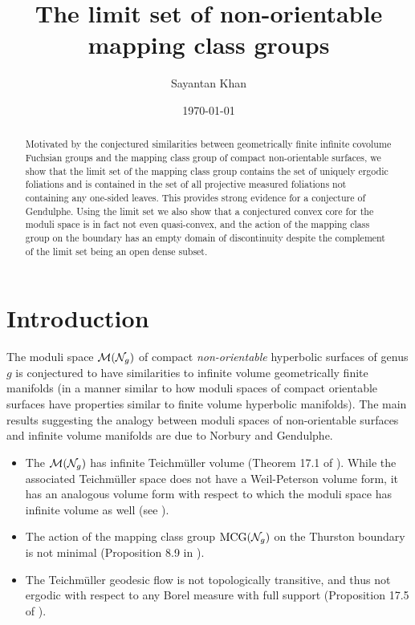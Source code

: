 \documentclass[12pt, reqno]{amsart}
\title{The limit set of non-orientable mapping class groups}
\author{Sayantan Khan}
\date{\today}
\begin{document}
\begin{abstract}
  Motivated by the conjectured similarities between geometrically finite infinite covolume Fuchsian groups and the mapping class group of compact non-orientable surfaces, we show that the limit set of the mapping class group contains the set of uniquely ergodic foliations and is contained in the set of all projective measured foliations not containing any one-sided leaves.
  This provides strong evidence for a conjecture of Gendulphe.
  Using the limit set we also show that a conjectured convex core for the moduli
  space is in fact not even quasi-convex, and the action of the mapping class group on the boundary has an empty domain of discontinuity despite the complement of the limit set being an open dense subset.
\end{abstract}
\maketitle


\section{Introduction}
\label{sec:introduction}


The moduli space $\mathcal{M}(\mathcal{N}_g)$ of compact \emph{non-orientable} hyperbolic surfaces of genus $g$ is conjectured to have similarities to infinite volume geometrically finite manifolds (in a manner similar to how moduli spaces of compact orientable surfaces have properties similar to finite volume hyperbolic manifolds).
The main results suggesting the analogy between moduli spaces of non-orientable surfaces and infinite volume manifolds are due to Norbury and Gendulphe.

\begin{itemize}
\item The $\mathcal{M}(\mathcal{N}_g)$ has infinite Teichm\"uller volume (Theorem 17.1 of \cite{gendulphe_whats_2017}).
  While the associated Teichm\"uller space does not have a Weil-Peterson volume form, it has an analogous volume form with respect to which the moduli space has infinite volume as well (see \cite{norbury2008lengths}).
\item The action of the mapping class group $\mathrm{MCG}(\mathcal{N}_g)$ on the Thurston boundary is not minimal (Proposition 8.9 in \cite{gendulphe_whats_2017}).
\item The Teichm\"uller geodesic flow is not topologically transitive, and thus not ergodic with respect to any Borel measure with full support (Proposition 17.5 of \cite{gendulphe_whats_2017}).
\end{itemize}
\end{document}
